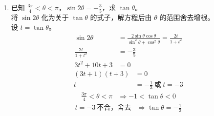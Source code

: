 \documentclass[12pt,a4paper]{exam-zh}
\begin{document}
\begin{solution}
    \begin{enumerate}[label=(\alph*)]
        \item 已知 $\frac{3\pi}{4}<\theta<\pi$，$\sin2\theta=-\frac{3}{5}$，求 $\tan\theta$。 \\
        将 $\sin2\theta$ 化为关于 $\tan\theta$ 的式子，解方程后由 $\theta$ 的范围舍去增根。 \\
        设 $t=\tan\theta$。
        \begin{align*}
            \sin2\theta &= \frac{2\sin\theta\cos\theta}{\sin^2\theta+\cos^2\theta} = \frac{2t}{1+t^2} \\
            \frac{2t}{1+t^2} &= -\frac{3}{5} \\
            3t^2+10t+3 &= 0
        \end{align*}
        \begin{align*}
            (3t+1)(t+3) &= 0 \\
            t &= -\frac{1}{3}\ \text{或}\ t=-3
        \end{align*}
        \begin{align*}
            \frac{3\pi}{4}<\theta<\pi &\Rightarrow -1<\tan\theta<0
        \end{align*}
        \begin{align*}
            t=-3\ \text{不合，舍去} &\Rightarrow \tan\theta=-\frac{1}{3}
        \end{align*}


\end{enumerate}
\end{solution}
\end{document}
